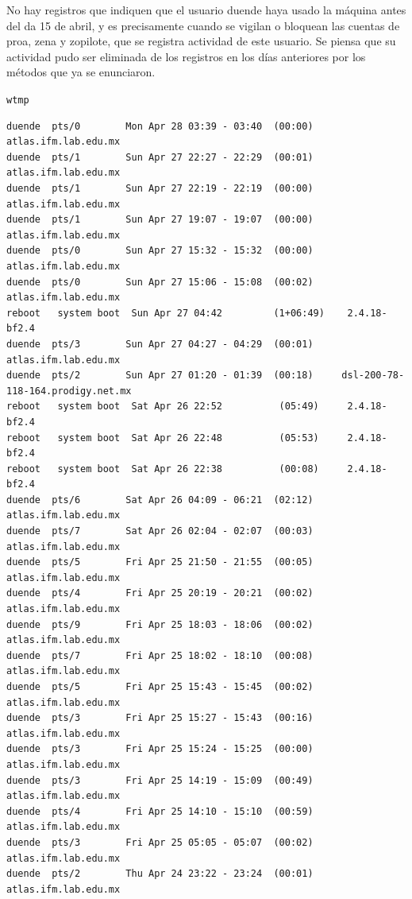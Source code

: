  No hay registros que indiquen que el usuario duende haya usado la
máquina antes del da 15 de abril, y es precisamente cuando se vigilan
o bloquean las cuentas de proa, zena y zopilote, que se registra
actividad de este usuario. Se piensa que su actividad pudo ser
eliminada de los registros en los días anteriores por los métodos que
ya se enunciaron.


\texttt{wtmp}

\vspace{1em}

\begin{lstlisting}[style=terminal]
duende  pts/0        Mon Apr 28 03:39 - 03:40  (00:00)     atlas.ifm.lab.edu.mx
duende  pts/1        Sun Apr 27 22:27 - 22:29  (00:01)     atlas.ifm.lab.edu.mx
duende  pts/1        Sun Apr 27 22:19 - 22:19  (00:00)     atlas.ifm.lab.edu.mx
duende  pts/1        Sun Apr 27 19:07 - 19:07  (00:00)     atlas.ifm.lab.edu.mx
duende  pts/0        Sun Apr 27 15:32 - 15:32  (00:00)     atlas.ifm.lab.edu.mx
duende  pts/0        Sun Apr 27 15:06 - 15:08  (00:02)     atlas.ifm.lab.edu.mx
reboot   system boot  Sun Apr 27 04:42         (1+06:49)    2.4.18-bf2.4
duende  pts/3        Sun Apr 27 04:27 - 04:29  (00:01)     atlas.ifm.lab.edu.mx
duende  pts/2        Sun Apr 27 01:20 - 01:39  (00:18)     dsl-200-78-118-164.prodigy.net.mx
reboot   system boot  Sat Apr 26 22:52          (05:49)     2.4.18-bf2.4
reboot   system boot  Sat Apr 26 22:48          (05:53)     2.4.18-bf2.4
reboot   system boot  Sat Apr 26 22:38          (00:08)     2.4.18-bf2.4
duende  pts/6        Sat Apr 26 04:09 - 06:21  (02:12)     atlas.ifm.lab.edu.mx
duende  pts/7        Sat Apr 26 02:04 - 02:07  (00:03)     atlas.ifm.lab.edu.mx
duende  pts/5        Fri Apr 25 21:50 - 21:55  (00:05)     atlas.ifm.lab.edu.mx
duende  pts/4        Fri Apr 25 20:19 - 20:21  (00:02)     atlas.ifm.lab.edu.mx
duende  pts/9        Fri Apr 25 18:03 - 18:06  (00:02)     atlas.ifm.lab.edu.mx
duende  pts/7        Fri Apr 25 18:02 - 18:10  (00:08)     atlas.ifm.lab.edu.mx
duende  pts/5        Fri Apr 25 15:43 - 15:45  (00:02)     atlas.ifm.lab.edu.mx
duende  pts/3        Fri Apr 25 15:27 - 15:43  (00:16)     atlas.ifm.lab.edu.mx
duende  pts/3        Fri Apr 25 15:24 - 15:25  (00:00)     atlas.ifm.lab.edu.mx
duende  pts/3        Fri Apr 25 14:19 - 15:09  (00:49)     atlas.ifm.lab.edu.mx
duende  pts/4        Fri Apr 25 14:10 - 15:10  (00:59)     atlas.ifm.lab.edu.mx
duende  pts/3        Fri Apr 25 05:05 - 05:07  (00:02)     atlas.ifm.lab.edu.mx
duende  pts/2        Thu Apr 24 23:22 - 23:24  (00:01)     atlas.ifm.lab.edu.mx

\end{lstlisting}
